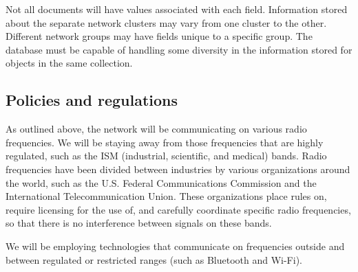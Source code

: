 \documentclass[tikz,a4paper,titlepage]{article}
\begin{document}
Not all documents will have values associated with each field. Information stored about the separate network clusters may vary from one cluster to the other. Different network groups may have fields unique to a specific group. The database must be capable of handling some diversity in the information stored for objects in the same collection.  




\subsection{Policies and regulations} %
As outlined above, the network will be communicating on various radio frequencies. We will be staying away from those frequencies that are highly regulated, such as the ISM (industrial, scientific, and medical) bands. Radio frequencies have been divided between industries by various organizations around the world, such as the U.S. Federal Communications Commission and the International Telecommunication Union. These organizations place rules on, require licensing for the use of, and carefully coordinate specific radio frequencies, so that there is no interference between signals on these bands.

We will be employing technologies that communicate on frequencies outside and between regulated or restricted ranges (such as Bluetooth and Wi-Fi).
\end{document}
